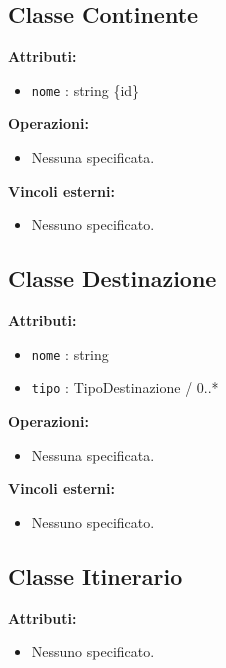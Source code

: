 \documentclass[a4paper]{scrartcl}
\begin{document}
\subsection{Classe Continente}

\textbf{Attributi:}
\begin{itemize}
    \item \texttt{nome} : string \{id\}
\end{itemize}

\textbf{Operazioni:}
\begin{itemize}
    \item Nessuna specificata.
\end{itemize}

\textbf{Vincoli esterni:}
\begin{itemize}
    \item Nessuno specificato.
\end{itemize}

\subsection{Classe Destinazione}

\textbf{Attributi:}
\begin{itemize}
    \item \texttt{nome} : string
    \item \texttt{tipo} : TipoDestinazione / 0..*
\end{itemize}

\textbf{Operazioni:}
\begin{itemize}
    \item Nessuna specificata.
\end{itemize}

\textbf{Vincoli esterni:}
\begin{itemize}
    \item Nessuno specificato.
\end{itemize}

\subsection{Classe Itinerario}

\textbf{Attributi:}
\begin{itemize}
    \item Nessuno specificato.
\end{itemize}
\end{document}
